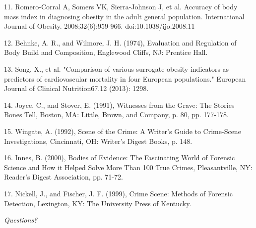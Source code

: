 \documentclass{beamer}
\begin{document}
\begin{frame}
11. Romero-Corral A, Somers VK, Sierra-Johnson J, et al. Accuracy of body mass index in diagnosing obesity in the adult general population. International Journal of Obesity. 2008;32(6):959-966. doi:10.1038/ijo.2008.11  

12. Behnke, A. R., and Wilmore, J. H. (1974), Evaluation and Regulation of Body Build and Composition, Englewood Cliffs, NJ: Prentice Hall. 
 
13. Song, X., et al. "Comparison of various surrogate obesity indicators as predictors of cardiovascular mortality in four European populations." European Journal of Clinical Nutrition67.12 (2013): 1298.  

14. Joyce, C., and Stover, E. (1991), Witnesses from the Grave: The Stories Bones Tell, Boston, MA: Little, Brown, and Company, p. 80, pp. 177-178.   

15. Wingate, A. (1992), Scene of the Crime: A Writer’s Guide to Crime-Scene Investigations, Cincinnati, OH: Writer’s Digest Books, p. 148.   

\end{frame}

\begin{frame}
16. Innes, B. (2000), Bodies of Evidence: The Fascinating World of Forensic Science and How it Helped Solve More Than 100 True Crimes, Pleasantville, NY: Reader’s Digest Association, pp. 71-72.  

17. Nickell, J., and Fischer, J. F. (1999), Crime Scene: Methods of Forensic Detection, Lexington, KY: The University Press of Kentucky.  

\end{frame}
\endgroup


\begin{frame}{}
\centering \Huge
\emph{Questions?}
\end{frame}
\end{document}
